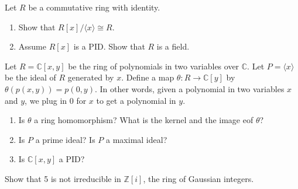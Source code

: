 \documentclass[12pt,letterpaper,boxed]{hmcpset}
\begin{document}


\begin{problem}[18.1.13]
Let $R$ be a commutative ring with identity.
\begin{enumerate}[label=\alph*]
\item Show that $R[x] / \langle x \rangle \cong R$.
\item Assume $R[x]$ is a PID. Show that $R$ is a field.
\end{enumerate}
\end{problem}

\begin{solution}
\end{solution}

\clearpage

\begin{problem}[18.1.16]
Let $R = \mathbb{C}[x,y]$ be the ring of polynomials in two variables over $\mathbb{C}$. Let $P = \langle x \rangle$ be the ideal of $R$ generated by $x$. Define a map $\theta: R \rightarrow \mathbb{C}[y]$ by $\theta(p(x,y)) = p(0,y)$. In other words, given a polynomial in two variables $x$ and $y$, we plug in 0 for $x$ to get a polynomial in $y$.
\begin{enumerate}[label=\alph*]
\item Is $\theta$ a ring homomorphism? What is the kernel and the image eof  $\theta$?
\item Is $P$ a prime ideal? Is $P$ a maximal ideal?
\item Is $\mathbb{C}[x,y]$ a PID?
\end{enumerate}
\end{problem}

\begin{solution}
\end{solution}

\clearpage

\begin{problem}[18.1.18]
Show that 5 is not irreducible in $\mathbb{Z}[i]$, the ring of Gaussian integers.
\end{problem}

\begin{solution}
\end{solution}

\clearpage
\end{document}
